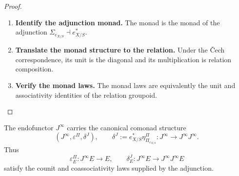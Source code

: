 \begin{proof}
\leavevmode
\begin{enumerate}[label=\textup{(\arabic*)}]
    \item \textbf{Identify the adjunction monad.}
The monad is the monad of the adjunction
\(\Sigma_{e_{X/S}}\dashv e_{X/S}^*\).

    \item \textbf{Translate the monad structure to the relation.}
Under the \v{C}ech correspondence, its unit is
the diagonal and its multiplication is relation composition.

    \item \textbf{Verify the monad laws.}
The monad laws are equivalently the unit and associativity identities of the
relation groupoid.
\end{enumerate}
\end{proof}

\begin{theorem}
\label{thm:jet-comonad}
The endofunctor \(J^\infty\) carries the canonical comonad structure
\[
  (J^\infty,\varepsilon^\Pi,\delta^J),
  \qquad
  \delta^J:=e_{X/S}^*\eta^\Pi_{\Pi_{e_{X/S}}}:
  J^\infty\to J^\infty J^\infty.
\]
Thus
\[
  \varepsilon^\Pi_E:J^\infty E\to E,
  \qquad
  \delta^J_E:J^\infty E\to J^\infty J^\infty E
\]
satisfy the counit and coassociativity laws supplied by the adjunction.
\end{theorem}

